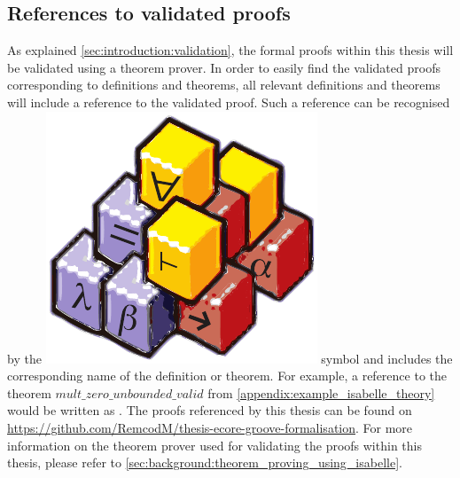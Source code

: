 \subsection{References to validated proofs}
\label{subsec:introduction:outline:references_to_validated_proofs}
As explained \cref{sec:introduction:validation}, the formal proofs within this thesis will be validated using a theorem prover. In order to easily find the validated proofs corresponding to definitions and theorems, all relevant definitions and theorems will include a reference to the validated proof. Such a reference can be recognised by the \includegraphics[height=0.75\baselineskip,keepaspectratio]{images/isabelle_logo.pdf} symbol and includes the corresponding name of the definition or theorem. For example, a reference to the theorem $mult\!\_zero\!\_unbounded\!\_valid$ from \cref{appendix:example_isabelle_theory} would be written as . The proofs referenced by this thesis can be found on \url{https://github.com/RemcodM/thesis-ecore-groove-formalisation}. For more information on the theorem prover used for validating the proofs within this thesis, please refer to \cref{sec:background:theorem_proving_using_isabelle}.